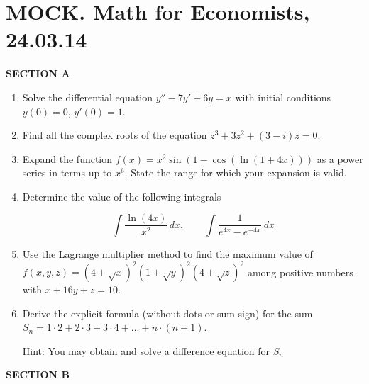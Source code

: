 \documentclass[12pt]{article}
\begin{document}
\newpage

\section*{MOCK. Math for Economists, 24.03.14}

\textbf{SECTION A}

\begin{enumerate}
\item Solve the differential equation $y''-7y'+6y=x$ with initial conditions $y(0)=0$, $y'(0)=1$. 




\item Find all the complex roots of the equation $z^3+3z^2+(3-i)z=0$. 


\item Expand the function $f(x)=x^2\sin(1-\cos(\ln(1+4x)))$  as a power series in terms up to $x^6$. State the range for which your expansion is valid.

\item Determine the value of the following integrals

\[ 
\int \frac{\ln (4x)}{x^2} \, dx, \qquad \int \frac{1}{e^{4x}-e^{-4x}} \, dx
\]


\item Use the Lagrange multiplier method to find the maximum value of $f(x,y,z)=(4+\sqrt{x})^2(1+\sqrt{y})^2(4+\sqrt{z})^2$ among positive numbers with $x+16y+z=10$.


\item Derive the explicit formula (without dots or sum sign) for the sum $S_n=1\cdot 2+2\cdot 3+3\cdot 4 +\ldots+ n\cdot (n+1)$.

Hint: You may obtain and solve a difference equation for $S_n$


\end{enumerate}

\textbf{SECTION B}
\end{document}
